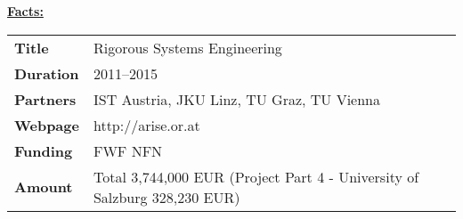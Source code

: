 \textcolor{\workinggroupboxtextcolor}{
	\textbf{\underline{Facts:}}
	\newline
	\newline
	\begin{tabular}{l p{}}
		\textbf{Title} & Rigorous Systems Engineering \\
		\textbf{Duration} & 2011--2015 \\
		\textbf{Partners} & IST Austria, JKU Linz, TU Graz, TU Vienna \\
        \textbf{Webpage} & http://arise.or.at\\
		\textbf{Funding} & FWF NFN \\
		\textbf{Amount} & Total 3,744,000 EUR (Project Part 4 - University of Salzburg 328,230 EUR) 
	\end{tabular}
}